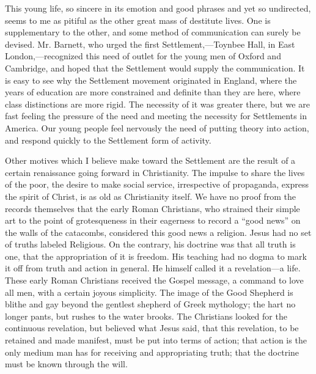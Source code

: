 This young life, so sincere in its emotion and good phrases and yet so
undirected, seems to me as pitiful as the other great mass of
destitute lives. One is supplementary to the other, and some method of
communication can surely be devised. Mr. Barnett, who urged the first
Settlement,---Toynbee Hall, in East London,---recognized this need of
outlet for the young men of Oxford and Cambridge, and hoped that the
Settlement would supply the communication. It is easy to see why the
Settlement movement originated in England, where the years of
education are more constrained and definite than they are here, where
class distinctions are more rigid. The necessity of it was greater
there, but we are fast feeling the pressure of the need and meeting
the necessity for Settlements in America. Our young people feel
nervously the need of  putting theory into action, and
respond quickly to the Settlement form of activity.


Other motives which I believe make toward the Settlement are the
result of a certain renaissance going forward in Christianity. The
impulse to share the lives of the poor, the desire to make social
service, irrespective of propaganda, express the spirit of Christ, is
as old as Christianity itself. We have no proof from the records
themselves that the early Roman Christians, who strained their simple
art to the point of grotesqueness in their eagerness to record a
``good news'' on the walls of the catacombs, considered this good news
a religion. Jesus had no set of truths labeled Religious. On the
contrary, his doctrine was that all truth is one, that the
appropriation of it is freedom. His teaching had no dogma to mark it
off from truth and action in general. He himself called it a
revelation---a life. These early Roman Christians received the Gospel
message, a command to love all men, with a certain joyous simplicity.
The image of the Good Shepherd is blithe and gay beyond the gentlest
shepherd of Greek mythology; the hart no longer pants, but rushes to
the water brooks. The Christians looked for the continuous revelation,
but believed what Jesus said, that this revelation, to be retained and
made manifest, must be put into terms of action; that action is the
only medium man has for receiving and appropriating truth; that the
doctrine must be known through the will.

